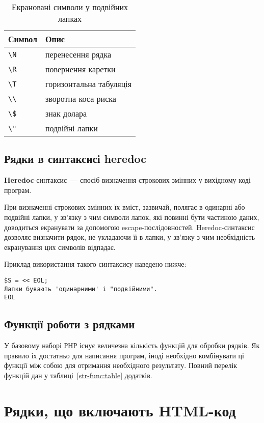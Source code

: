 \begin{center}
\begin{longtable}[t]{|l|p{20em}|}
\caption{Екрановані символи у подвійних лапках} \label{doub-lap:table}\\
\hline
Символ & Опис \\
\hline
\verb'\N' & перенесення рядка \\
\verb'\R' & повернення каретки \\
\verb'\T' & горизонтальна табуляція \\
\verb'\\' & зворотна коса риска \\
\verb'\$' & знак долара \\
\verb'\"' & подвійні лапки \\
\hline
\end{longtable}
\end{center}

\subsection*{Рядки в синтаксисі heredoc}
\textbf{Heredoc}-синтаксис~--- спосіб визначення строкових змінних у вихідному коді програм.

При визначенні строкових змінних їх вміст, зазвичай, полягає в одинарні або подвійні лапки, у зв'язку з чим символи лапок, які повинні бути частиною даних, доводиться екранувати за допомогою escape-послідовностей. Heredoc-синтаксис дозволяє визначити рядок, не укладаючи її в лапки, у зв'язку з чим необхідність екранування цих символів відпадає.

Приклад використання такого синтаксису наведено нижче:
\begin{verbatim}
$S = << EOL; 
Лапки бувають 'одинарними' і "подвійними". 
EOL
\end{verbatim} 
\subsection*{Функції роботи з рядками}
У базовому наборі РНР існує величезна кількість функцій для обробки рядків. Як правило іх достатньо для написання програм, іноді необхідно комбінувати ці функції між собою для отримання необхідного результату. Повний перелік функцій дан у таблиці~\ref{str-func:table} додатків.

\pagebreak[3]
\section{Рядки, що включають HTML-код}
\nopagebreak[4]


